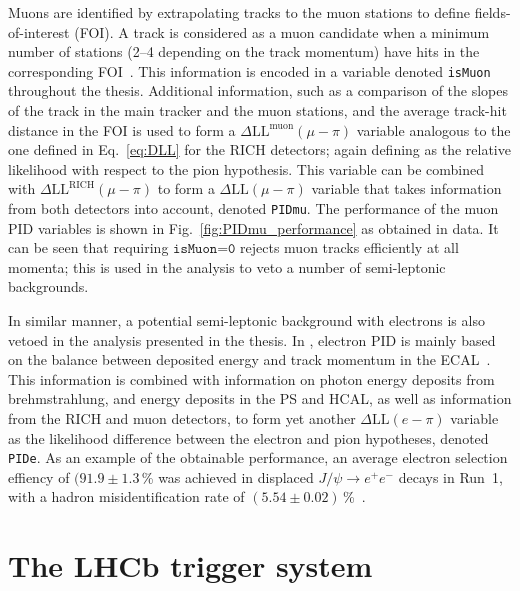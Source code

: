 Muons are identified by extrapolating tracks to the muon stations to define fields-of-interest (FOI). A track is considered as a muon candidate when a minimum number of stations (2--4 depending on the track momentum) have hits in the corresponding FOI~\cite{MuonPID,MuonPID2}. This information is encoded in a variable denoted \texttt{isMuon} throughout the thesis. Additional information, such as a comparison of the slopes of the track in the main tracker and the muon stations, and the average track-hit distance in the FOI is used to form a $\Delta \text{LL}^\text{muon}(\mu-\pi)$ variable analogous to the one defined in Eq.~\eqref{eq:DLL} for the RICH detectors; again defining as the relative likelihood with respect to the pion hypothesis. This variable can be combined with $\Delta \text{LL}^\text{RICH}(\mu-\pi)$ to form a $\Delta \text{LL}(\mu-\pi)$ variable that takes information from both detectors into account, denoted \texttt{PIDmu}. The performance of the muon PID variables is shown in Fig.~\ref{fig:PIDmu_performance} as obtained in data. It can be seen that requiring $\texttt{isMuon=0}$ rejects muon tracks efficiently at all momenta; this is used in the analysis to veto a number of semi-leptonic backgrounds.

In similar manner, a potential semi-leptonic background with electrons is also vetoed in the analysis presented in the thesis. In \lhcb, electron PID is mainly based on the balance between deposited energy and track momentum in the ECAL~\cite{ElectronPID}. This information is combined with information on photon energy deposits from brehmstrahlung, and energy deposits in the PS and HCAL, as well as information from the RICH and muon detectors, to form yet another $\Delta\text{LL}(e-\pi)$ variable as the likelihood difference between the electron and pion hypotheses, denoted \texttt{PIDe}. As an example of the obtainable performance, an average electron selection effiency of $(91.9\pm1.3$\,\% was achieved in displaced $J/\psi\to e^+e^-$ decays in Run~1, with a hadron misidentification rate of $(5.54\pm0.02)$\,\%~\cite{LHCb-Performance}.



\section{The LHCb trigger system} %
\label{sec:the_lhcb_triggerring_system}


